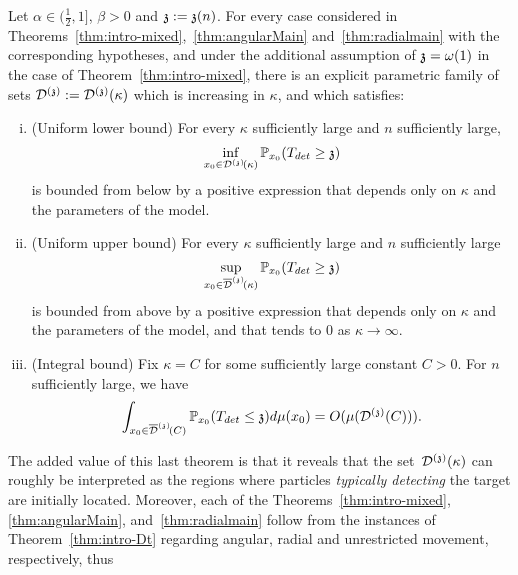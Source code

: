 \begin{theorem}{\label{thm:intro-Dt}}
Let $\alpha\in (\frac12,1]$, $\beta > 0$ and $\ss:=\ss(n)$. For every case considered in Theorems~\ref{thm:intro-mixed},~\ref{thm:angularMain} and~\ref{thm:radialmain} with the corresponding hypotheses, and under the additional assumption of $\ss=\omega(1)$ in the case of Theorem~\ref{thm:intro-mixed}, there is an explicit parametric family of sets $\dt:=\dt(\kappa)$ which is increasing in $\kappa$, and which satisfies:
\begin{enumerate}[(i)]
    \item\label{lowerDt} (Uniform lower bound) For every $\kappa$ sufficiently large and $n$ sufficiently large, 
    \[
    \inf_{x_0\in\dt\!(\kappa)}\PP_{x_0}(T_{det}\ge\ss)
    \]
    is bounded from below by a positive expression that depends only on $\kappa$ and the parameters of the model.
    
    \item\label{upperDt} (Uniform upper bound) For every $\kappa$ sufficiently large and $n$ 
    sufficiently large
    \[
    \sup_{x_0\in\ndt\!(\kappa)}\PP_{x_0}(T_{det}\ge\ss)
    \]
    is bounded from above by a positive expression that depends only on $\kappa$ and the parameters of the model, and that tends to $0$ as $\kappa \to \infty$.
    
    \item\label{integralDt} (Integral bound) Fix $\kappa=C$ for some sufficiently large constant $C>0$. For $n$ sufficiently large, we have %
    \[
    \int_{x_0\in\ndt\!(C)}\PP_{x_0}(T_{det}\le\ss)d\mu(x_0) = O(\mu(\dt(C))).
    \]
\end{enumerate}
\end{theorem}
The added value of this last theorem is that it reveals that the set~$\dt(\kappa)$  
can roughly be interpreted as the regions where particles \emph{typically detecting} the target are initially located. Moreover, each of the 
Theorems~\ref{thm:intro-mixed}, \ref{thm:angularMain}, and~\ref{thm:radialmain} follow from the instances of Theorem~\ref{thm:intro-Dt} regarding angular, radial and unrestricted movement, respectively, thus
